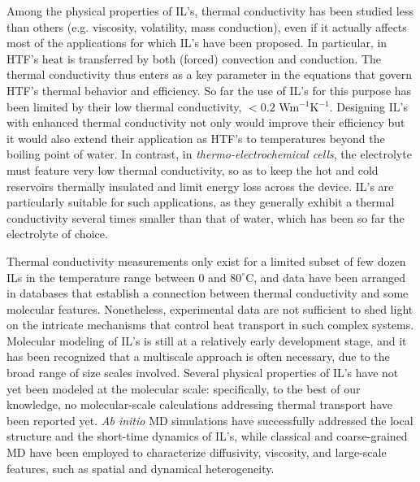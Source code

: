 Among the physical properties of IL's, thermal conductivity has been studied less than others (e.g. viscosity, volatility, mass conduction), even if it actually affects most of the applications for which IL's have been proposed. In particular, in HTF's heat is transferred by both (forced) convection and conduction\cite{Yu:2010eo}. The thermal conductivity thus enters as a key parameter in the equations that govern HTF's thermal behavior and efficiency.\cite{Brennecke:2001hh} So far the use of IL's for this purpose has been limited by their low thermal conductivity, $<0.2$ Wm$^{-1}$K$^{-1}$. Designing IL's with enhanced thermal conductivity not only would improve their efficiency but it would also extend their application as HTF's to temperatures beyond the boiling point of water. In contrast, in \textit{thermo-electrochemical cells}, the electrolyte must feature very low thermal conductivity, so as to keep the hot and cold reservoirs thermally insulated and limit energy loss across the device.\cite{Abraham:2013go} IL's are particularly suitable for such applications, as they generally exhibit a thermal conductivity several times smaller than that of water, which has been so far the electrolyte of choice. 

Thermal conductivity measurements only exist for a limited subset of few dozen ILs in the temperature range between 0 and $80^\circ$C, and data have been arranged in databases that establish a connection between thermal conductivity and some molecular features.\cite{Chen:2014fl,Atashrouz:2015cu} Nonetheless, experimental data are not sufficient to shed light on the intricate mechanisms that control heat transport in such complex systems. Molecular modeling of IL's is still at a relatively early development stage, and it has been recognized that a multiscale approach is often necessary, due to the broad range of size scales involved.\cite{Dong:2017df} Several physical properties of IL's have not yet been modeled at the molecular scale: specifically, to the best of our knowledge, no molecular-scale calculations addressing thermal transport have been reported yet. {\sl Ab initio} MD simulations have successfully addressed the local structure and the short-time dynamics of IL's,\cite{Wendler:2012ho} while classical and coarse-grained MD have been employed to characterize diffusivity, viscosity, and large-scale features, such as spatial and dynamical heterogeneity.\cite{Wang:2007iy}


